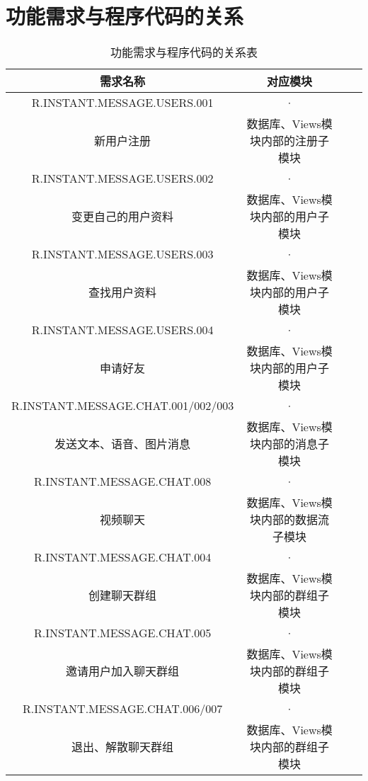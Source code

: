 \section{功能需求与程序代码的关系}
\begin{table}[htbp]
\centering
\caption{功能需求与程序代码的关系表} \label{tab:requirement-module}
\begin{tabular}{|c|c|c|c|}
    \hline
    需求名称  & 对应模块 \\
    \hline
	R.INSTANT.MESSAGE.USERS.001 & · \\
	新用户注册 & 数据库、Views模块内部的注册子模块 \\
    \hline
	R.INSTANT.MESSAGE.USERS.002 & · \\
	变更自己的用户资料 & 数据库、Views模块内部的用户子模块 \\
    \hline
	R.INSTANT.MESSAGE.USERS.003 & · \\
	查找用户资料 & 数据库、Views模块内部的用户子模块\\
	\hline
	R.INSTANT.MESSAGE.USERS.004 & · \\
	申请好友 & 数据库、Views模块内部的用户子模块 \\
	\hline
	R.INSTANT.MESSAGE.CHAT.001/002/003 & · \\
	发送文本、语音、图片消息 & 数据库、Views模块内部的消息子模块 \\
	\hline
	R.INSTANT.MESSAGE.CHAT.008 & · \\
	视频聊天 & 数据库、Views模块内部的数据流子模块 \\
	\hline
	R.INSTANT.MESSAGE.CHAT.004 & · \\
	创建聊天群组 & 数据库、Views模块内部的群组子模块 \\
    \hline
	R.INSTANT.MESSAGE.CHAT.005 & · \\
	邀请用户加入聊天群组 & 数据库、Views模块内部的群组子模块 \\
	\hline
	R.INSTANT.MESSAGE.CHAT.006/007 & · \\
	退出、解散聊天群组 & 数据库、Views模块内部的群组子模块 \\
	\hline
	\hline
\end{tabular}
\end{table}